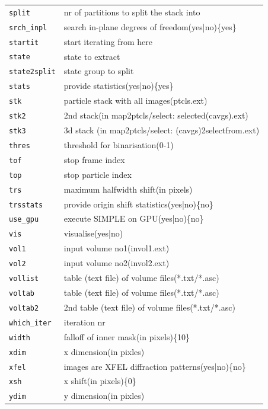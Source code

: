 \documentclass[a4paper,11pt]{article}
\begin{document}
\begin{tabular}{ll}
\texttt{split}&{nr of partitions to split the stack into}\\
\texttt{srch\_inpl}&{search in-plane degrees of freedom(yes|no)\{yes\}}\\
\texttt{startit}&{start iterating from here}\\
\texttt{state}&{state to extract}\\
\texttt{state2split}&{state group to split}\\
\texttt{stats}&{provide statistics(yes|no)\{yes\}}\\
\texttt{stk}&{particle stack with all images(ptcls.ext)}\\
\texttt{stk2}&{2nd stack(in map2ptcls/select: selected(cavgs).ext)}\\
\texttt{stk3}&{3d stack (in map2ptcls/select: (cavgs)2selectfrom.ext)}\\
\texttt{thres}&{threshold for binarisation(0-1)}\\
\texttt{tof}&{stop frame index}\\
\texttt{top}&{stop particle index}\\
\texttt{trs}&{maximum halfwidth shift(in pixels)}\\
\texttt{trsstats}&{provide origin shift statistics(yes|no)\{no\}}\\
\texttt{use\_gpu}&{execute SIMPLE on GPU(yes|no)\{no\}}\\
\texttt{vis}&{visualise(yes|no)}\\
\texttt{vol1}&{input volume no1(invol1.ext)}\\
\texttt{vol2}&{input volume no2(invol2.ext)}\\
\texttt{vollist}&{table (text file) of volume files(*.txt/*.asc)}\\
\texttt{voltab}&{table (text file) of volume files(*.txt/*.asc)}\\
\texttt{voltab2}&{2nd table (text file) of volume files(*.txt/*.asc)}\\
\texttt{which\_iter}&{iteration nr}\\
\texttt{width}&{falloff of inner mask(in pixels)\{10\}}\\
\texttt{xdim}&{x dimension(in pixles)}\\
\texttt{xfel}&{images are XFEL diffraction patterns(yes|no)\{no\}}\\
\texttt{xsh}&{x shift(in pixels)\{0\}}\\
\texttt{ydim}&{y dimension(in pixles)}\\
\end{tabular}
\end{document}
